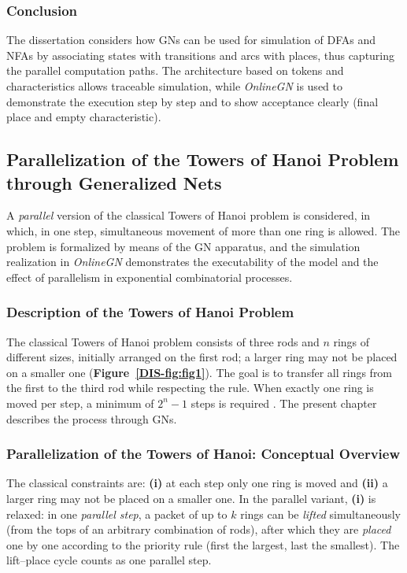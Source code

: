 	\subsubsection{Conclusion}
	
	\hspace*{2.5em}The dissertation considers how GNs can be used for simulation of DFAs and NFAs by associating states with transitions and arcs with places, thus capturing the parallel computation paths. The architecture based on tokens and characteristics allows traceable simulation, while \textit{OnlineGN} is used to demonstrate the execution step by step and to show acceptance clearly (final place and empty characteristic).
	
	
	\subsection{Parallelization of the Towers of Hanoi Problem through Generalized Nets}
	\medskip
	\hspace*{2.5em}A \emph{parallel} version of the classical Towers of Hanoi problem is considered, in which, in one step, simultaneous movement of more than one ring is allowed. The problem is formalized by means of the GN apparatus, and the simulation realization in \textit{OnlineGN} demonstrates the executability of the model and the effect of parallelism in exponential combinatorial processes.
	
	\subsubsection{Description of the Towers of Hanoi Problem}
	\hspace*{2.5em}The classical Towers of Hanoi problem \cite{DIS-wikipediaHanoi} consists of three rods and \(n\) rings of different sizes, initially arranged on the first rod; a larger ring may not be placed on a smaller one (\textbf{Figure~\ref{DIS-fig:fig1}}). The goal is to transfer all rings from the first to the third rod while respecting the rule. When exactly one ring is moved per step, a minimum of \(2^{n}-1\) steps is required \cite{DIS-frame1945,CLRS_TowerOfHanoi}. The present chapter describes the process through GNs.
	
	\subsubsection{{Parallelization of the Towers of Hanoi: Conceptual Overview}\label{sec:parallel-concept}}
	\hspace*{2.5em}The classical constraints are: \textbf{(i)} at each step only one ring is moved and \textbf{(ii)} a larger ring may not be placed on a smaller one. In the parallel variant, \textbf{(i)} is relaxed: in one \emph{parallel step}, a packet of up to \(k\) rings can be \emph{lifted} simultaneously (from the tops of an arbitrary combination of rods), after which they are \emph{placed} one by one according to the priority rule (first the largest, last the smallest). The lift--place cycle counts as one parallel step.
	
